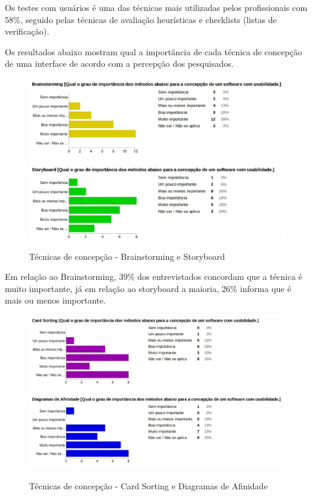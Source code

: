 	Os testes com usuários é uma das técnicas mais utilizadas pelos profissionais com 58\%, seguido pelas técnicas de avaliação heurísticas e checklists (listas de verificação). 
	
	Os resultados abaixo mostram qual a importância de cada técnica de concepção de uma interface de acordo com a percepção dos pesquisados.
	
	\begin{figure}[!h]
    	\centering
    	\includegraphics[keepaspectratio=true,scale=0.55]
      		{figuras/concepcao1.eps}
    	\label{concepcao}
		\caption{Técnicas de concepção - Brainstorming e Storyboard}
	\end{figure}
	
	Em relação ao Brainstorming, 39\% dos entrevistados concordam que a técnica é muito importante, já em relação ao storyboard a maioria, 26\% informa que é mais ou menos importante. 
	
	\begin{figure}[!h]
    	\centering
    	\includegraphics[keepaspectratio=true,scale=0.55]
      		{figuras/concepcao2.eps}
    	\label{check04}
		\caption{Técnicas de concepção - Card Sorting e Diagramas de Afinidade}
	\end{figure}


